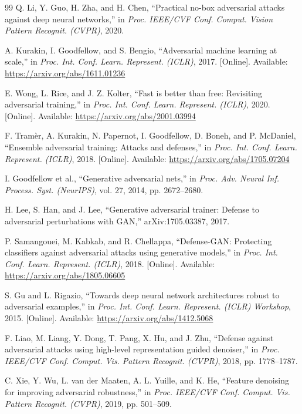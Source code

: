 \documentclass[12pt]{article}
\begin{document}
\begin{thebibliography}{99}
 Q. Li, Y. Guo, H. Zha, and H. Chen, ``Practical no-box adversarial attacks against deep neural networks,'' in \textit{Proc. IEEE/CVF Conf. Comput. Vision Pattern Recognit. (CVPR)}, 2020.

 A. Kurakin, I. Goodfellow, and S. Bengio, ``Adversarial machine learning at scale,'' in \textit{Proc. Int. Conf. Learn. Represent. (ICLR)}, 2017. [Online]. Available: \url{https://arxiv.org/abs/1611.01236}

 E. Wong, L. Rice, and J. Z. Kolter, ``Fast is better than free: Revisiting adversarial training,'' in \textit{Proc. Int. Conf. Learn. Represent. (ICLR)}, 2020. [Online]. Available: \url{https://arxiv.org/abs/2001.03994}

 F. Tram{\`e}r, A. Kurakin, N. Papernot, I. Goodfellow, D. Boneh, and P. McDaniel, ``Ensemble adversarial training: Attacks and defenses,'' in \textit{Proc. Int. Conf. Learn. Represent. (ICLR)}, 2018. [Online]. Available: \url{https://arxiv.org/abs/1705.07204}

 I. Goodfellow et al., ``Generative adversarial nets,'' in \textit{Proc. Adv. Neural Inf. Process. Syst. (NeurIPS)}, vol. 27, 2014, pp. 2672--2680.

 H. Lee, S. Han, and J. Lee, ``Generative adversarial trainer: Defense to adversarial perturbations with GAN,'' arXiv:1705.03387, 2017.

 P. Samangouei, M. Kabkab, and R. Chellappa, ``Defense-GAN: Protecting classifiers against adversarial attacks using generative models,'' in \textit{Proc. Int. Conf. Learn. Represent. (ICLR)}, 2018. [Online]. Available: \url{https://arxiv.org/abs/1805.06605}

 S. Gu and L. Rigazio, ``Towards deep neural network architectures robust to adversarial examples,'' in \textit{Proc. Int. Conf. Learn. Represent. (ICLR) Workshop}, 2015. [Online]. Available: \url{https://arxiv.org/abs/1412.5068}

 F. Liao, M. Liang, Y. Dong, T. Pang, X. Hu, and J. Zhu, ``Defense against adversarial attacks using high-level representation guided denoiser,'' in \textit{Proc. IEEE/CVF Conf. Comput. Vis. Pattern Recognit. (CVPR)}, 2018, pp. 1778--1787.

 C. Xie, Y. Wu, L. van der Maaten, A. L. Yuille, and K. He, ``Feature denoising for improving adversarial robustness,'' in \textit{Proc. IEEE/CVF Conf. Comput. Vis. Pattern Recognit. (CVPR)}, 2019, pp. 501--509.

\end{thebibliography}
\end{document}
